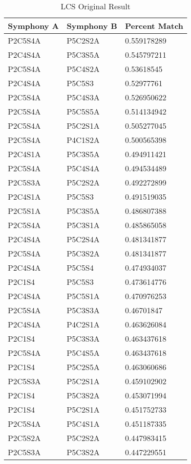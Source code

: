 \begin{longtable}{|l|l|l|}
\caption{LCS Original Result}
\label{my-label}\\
\hline
Symphony A & Symphony B & Percent Match \\ \hline
\endfirsthead
%
\endhead
%
P2C5S4A & P5C2S2A & 0.559178289 \\ \hline
P2C4S4A & P5C3S5A & 0.545797211 \\ \hline
P2C5S4A & P5C4S2A & 0.53618545 \\ \hline
P2C4S4A & P5C5S3 & 0.52977761 \\ \hline
P2C5S4A & P5C4S3A & 0.526950622 \\ \hline
P2C5S4A & P5C5S5A & 0.514134942 \\ \hline
P2C5S4A & P5C2S1A & 0.505277045 \\ \hline
P2C5S4A & P4C1S2A & 0.500565398 \\ \hline
P2C4S1A & P5C3S5A & 0.494911421 \\ \hline
P2C5S4A & P5C4S4A & 0.494534489 \\ \hline
P2C5S3A & P5C2S2A & 0.492272899 \\ \hline
P2C4S1A & P5C5S3 & 0.491519035 \\ \hline
P2C5S1A & P5C3S5A & 0.486807388 \\ \hline
P2C5S4A & P5C3S1A & 0.485865058 \\ \hline
P2C4S4A & P5C2S4A & 0.481341877 \\ \hline
P2C5S4A & P5C3S2A & 0.481341877 \\ \hline
P2C4S4A & P5C5S4 & 0.474934037 \\ \hline
P2C1S4 & P5C5S3 & 0.473614776 \\ \hline
P2C4S4A & P5C5S1A & 0.470976253 \\ \hline
P2C5S4A & P5C3S3A & 0.46701847 \\ \hline
P2C4S4A & P4C2S1A & 0.463626084 \\ \hline
P2C1S4 & P5C3S3A & 0.463437618 \\ \hline
P2C5S4A & P5C4S5A & 0.463437618 \\ \hline
P2C1S4 & P5C2S5A & 0.463060686 \\ \hline
P2C5S3A & P5C2S1A & 0.459102902 \\ \hline
P2C1S4 & P5C3S2A & 0.453071994 \\ \hline
P2C1S4 & P5C2S1A & 0.451752733 \\ \hline
P2C5S4A & P5C4S1A & 0.451187335 \\ \hline
P2C5S2A & P5C2S2A & 0.447983415 \\ \hline
P2C5S3A & P5C3S2A & 0.447229551 \\ \hline
\end{longtable}

